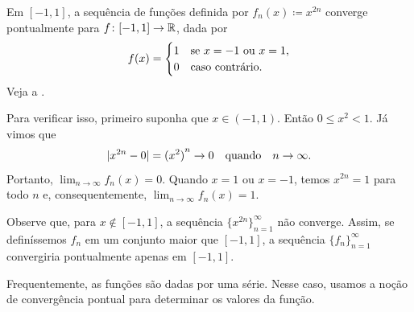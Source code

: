 \begin{example}
Em $[-1,1]$, a sequência de funções definida por $f_n(x) \coloneqq x^{2n}$
converge pontualmente para $f \colon [-1,1] \to {\mathbb{R}}$, dada por
\begin{equation*}
f(x) =
\begin{cases}
1 & \text{se } x=-1 \text{ ou } x=1, \\
0 & \text{caso contrário.}
\end{cases}
\avoidbreak
\end{equation*}
Veja a .

\begin{myfigureht}
\caption{Gráficos de $f_1$, $f_2$, $f_3$ e $f_8$, para
$f_n(x) \coloneqq x^{2n}$.\label{x2nfig}}
\end{myfigureht}

Para verificar isso, primeiro suponha que $x\in(-1,1)$. Então
$0\leq x^2<1$. Já vimos que
\begin{equation*}
\lvert {x^{2n} - 0} \rvert = {(x^2)}^n \to 0 \quad \text{quando} \quad n \to \infty .
\end{equation*}
Portanto, $\lim_{n\to\infty}f_n(x)=0$. Quando $x=1$ ou $x=-1$, temos
$x^{2n}=1$ para todo $n$ e, consequentemente,
$\lim_{n\to\infty}f_n(x)=1$.

Observe que, para $x\notin[-1,1]$, a sequência $\{x^{2n}\}_{n=1}^\infty$
não converge. Assim, se definíssemos $f_n$ em um conjunto maior que
$[-1,1]$, a sequência $\{f_n\}_{n=1}^\infty$ convergiria pontualmente
apenas em $[-1,1]$.
\end{example}

Frequentemente, as funções são dadas por uma série. Nesse caso, usamos a
noção de convergência pontual para determinar os valores da função.


